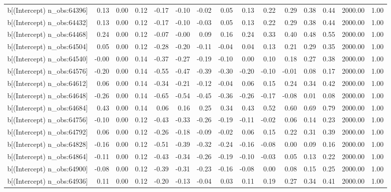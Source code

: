 \begin{table}[ht]
\begin{tabular}{rrrrrrrrrrrrrrr}
  b[(Intercept) n\_obs:64396] & 0.13 & 0.00 & 0.12 & -0.17 & -0.10 & -0.02 & 0.05 & 0.13 & 0.22 & 0.29 & 0.38 & 0.44 & 2000.00 & 1.00 \\ 
  b[(Intercept) n\_obs:64432] & 0.13 & 0.00 & 0.12 & -0.17 & -0.10 & -0.03 & 0.05 & 0.13 & 0.22 & 0.29 & 0.38 & 0.44 & 2000.00 & 1.00 \\ 
  b[(Intercept) n\_obs:64468] & 0.24 & 0.00 & 0.12 & -0.07 & -0.00 & 0.09 & 0.16 & 0.24 & 0.33 & 0.40 & 0.48 & 0.55 & 2000.00 & 1.00 \\ 
  b[(Intercept) n\_obs:64504] & 0.05 & 0.00 & 0.12 & -0.28 & -0.20 & -0.11 & -0.04 & 0.04 & 0.13 & 0.21 & 0.29 & 0.35 & 2000.00 & 1.00 \\ 
  b[(Intercept) n\_obs:64540] & -0.00 & 0.00 & 0.14 & -0.37 & -0.27 & -0.19 & -0.10 & 0.00 & 0.10 & 0.18 & 0.27 & 0.38 & 2000.00 & 1.00 \\ 
  b[(Intercept) n\_obs:64576] & -0.20 & 0.00 & 0.14 & -0.55 & -0.47 & -0.39 & -0.30 & -0.20 & -0.10 & -0.01 & 0.08 & 0.17 & 2000.00 & 1.00 \\ 
  b[(Intercept) n\_obs:64612] & 0.06 & 0.00 & 0.14 & -0.34 & -0.21 & -0.12 & -0.04 & 0.06 & 0.15 & 0.24 & 0.34 & 0.42 & 2000.00 & 1.00 \\ 
  b[(Intercept) n\_obs:64648] & -0.26 & 0.00 & 0.14 & -0.65 & -0.54 & -0.45 & -0.36 & -0.26 & -0.17 & -0.08 & 0.01 & 0.08 & 2000.00 & 1.00 \\ 
  b[(Intercept) n\_obs:64684] & 0.43 & 0.00 & 0.14 & 0.06 & 0.16 & 0.25 & 0.34 & 0.43 & 0.52 & 0.60 & 0.69 & 0.79 & 2000.00 & 1.00 \\ 
  b[(Intercept) n\_obs:64756] & -0.10 & 0.00 & 0.12 & -0.43 & -0.33 & -0.26 & -0.19 & -0.11 & -0.02 & 0.06 & 0.14 & 0.23 & 2000.00 & 1.00 \\ 
  b[(Intercept) n\_obs:64792] & 0.06 & 0.00 & 0.12 & -0.26 & -0.18 & -0.09 & -0.02 & 0.06 & 0.15 & 0.22 & 0.31 & 0.39 & 2000.00 & 1.00 \\ 
  b[(Intercept) n\_obs:64828] & -0.16 & 0.00 & 0.12 & -0.51 & -0.39 & -0.32 & -0.24 & -0.16 & -0.08 & 0.00 & 0.09 & 0.16 & 2000.00 & 1.00 \\ 
  b[(Intercept) n\_obs:64864] & -0.11 & 0.00 & 0.12 & -0.43 & -0.34 & -0.26 & -0.19 & -0.10 & -0.03 & 0.05 & 0.13 & 0.22 & 2000.00 & 1.00 \\ 
  b[(Intercept) n\_obs:64900] & -0.08 & 0.00 & 0.12 & -0.39 & -0.31 & -0.23 & -0.16 & -0.08 & 0.00 & 0.08 & 0.15 & 0.25 & 2000.00 & 1.00 \\ 
  b[(Intercept) n\_obs:64936] & 0.11 & 0.00 & 0.12 & -0.20 & -0.13 & -0.04 & 0.03 & 0.11 & 0.19 & 0.27 & 0.34 & 0.41 & 2000.00 & 1.00 \\ 

\end{tabular}
\end{table}
